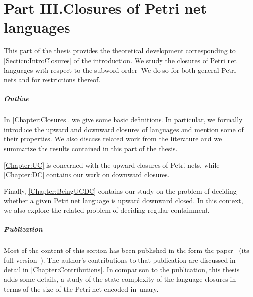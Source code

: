 \documentclass[../../diss.tex]{subfiles}
\begin{document}
\chapter*{Part III.\newline Closures of Petri net languages}

This part of the thesis provides the theoretical development corresponding to \cref{Section:IntroClosures} of the introduction.
We study the closures of Petri net languages with respect to the subword order.
We do so for both general Petri nets and for restrictions thereof.

\paragraph{Outline}

In \cref{Chapter:Closures}, we give some basic definitions.
In particular, we formally introduce the upward and downward closures of languages and mention some of their properties.
We also discuss related work from the literature and we summarize the results contained in this part of the thesis.

\cref{Chapter:UC} is concerned with the upward closures of Petri nets, while \cref{Chapter:DC} contains our work on downward closures.

Finally, \cref{Chapter:BeingUCDC} contains our study on the problem of deciding whether a given Petri net language is upward \resp downward closed.
In this context, we also explore the related problem of deciding regular containment.

\paragraph{Publication}

Most of the content of this section has been published in the form the paper~\cite{AtigMMS17} (\resp its full version~\cite{AtigMMS17a}).
The author's contributions to that publication are discussed in detail in \cref{Chapter:Contributions}.
In comparison to the publication, this thesis adds some details, \eg a study of the state complexity of the language closures in terms of the size of the Petri net encoded in~unary.
\end{document}
